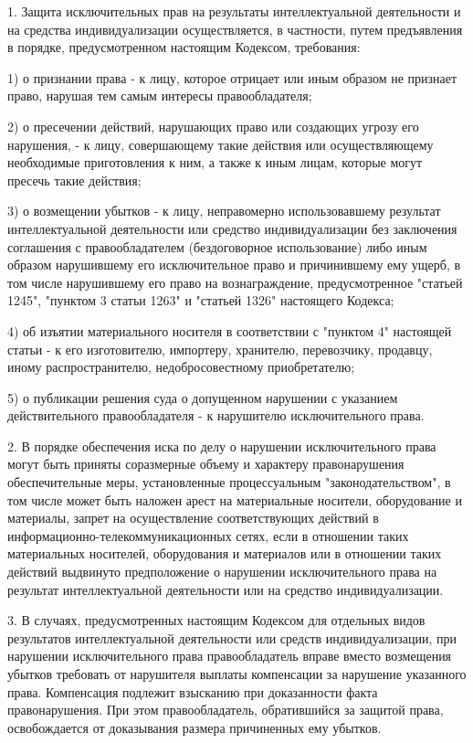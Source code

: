 1. Защита исключительных прав на результаты интеллектуальной деятельности и на средства индивидуализации осуществляется, в частности, путем предъявления в порядке, предусмотренном настоящим Кодексом, требования:

1) о признании права - к лицу, которое отрицает или иным образом не признает право, нарушая тем самым интересы правообладателя;

2) о пресечении действий, нарушающих право или создающих угрозу его нарушения, - к лицу, совершающему такие действия или осуществляющему необходимые приготовления к ним, а также к иным лицам, которые могут пресечь такие действия;

3) о возмещении убытков - к лицу, неправомерно использовавшему результат интеллектуальной деятельности или средство индивидуализации без заключения соглашения с правообладателем (бездоговорное использование) либо иным образом нарушившему его исключительное право и причинившему ему ущерб, в том числе нарушившему его право на вознаграждение, предусмотренное "статьей 1245", "пунктом 3 статьи 1263" и "статьей 1326" настоящего Кодекса;

4) об изъятии материального носителя в соответствии с "пунктом 4" настоящей статьи - к его изготовителю, импортеру, хранителю, перевозчику, продавцу, иному распространителю, недобросовестному приобретателю;

5) о публикации решения суда о допущенном нарушении с указанием действительного правообладателя - к нарушителю исключительного права.

2. В порядке обеспечения иска по делу о нарушении исключительного права могут быть приняты соразмерные объему и характеру правонарушения обеспечительные меры, установленные процессуальным "законодательством", в том числе может быть наложен арест на материальные носители, оборудование и материалы, запрет на осуществление соответствующих действий в информационно-телекоммуникационных сетях, если в отношении таких материальных носителей, оборудования и материалов или в отношении таких действий выдвинуто предположение о нарушении исключительного права на результат интеллектуальной деятельности или на средство индивидуализации.

3. В случаях, предусмотренных настоящим Кодексом для отдельных видов результатов интеллектуальной деятельности или средств индивидуализации, при нарушении исключительного права правообладатель вправе вместо возмещения убытков требовать от нарушителя выплаты компенсации за нарушение указанного права. Компенсация подлежит взысканию при доказанности факта правонарушения. При этом правообладатель, обратившийся за защитой права, освобождается от доказывания размера причиненных ему убытков.
 
